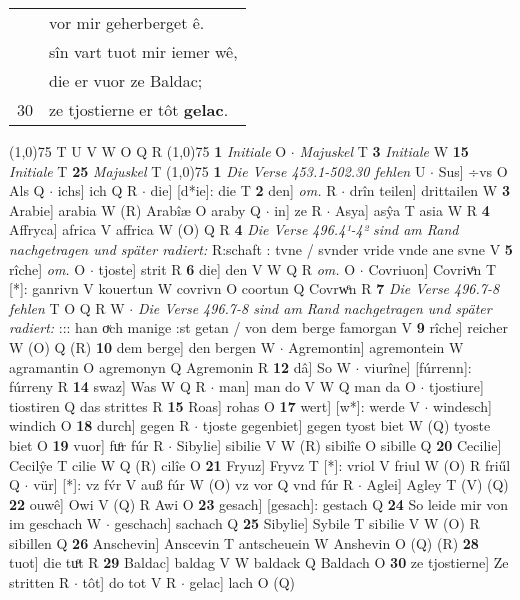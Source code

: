 \documentclass[8pt,a4paper,notitlepage]{article}
\begin{document}
\begin{table}[ht]
\begin{minipage}[t]{0.5\linewidth}
\begin{tabular}{rl}
 & vor mir geherberget ê.\\ 
 & sîn vart tuot mir iemer wê,\\ 
 & die er vuor ze Baldac;\\ 
30 & ze tjostierne er tôt \textbf{gelac}.\\ 
\end{tabular}
\scriptsize
\line(1,0){75} \newline
T U V W O Q R \newline
\line(1,0){75} \newline
\textbf{1} \textit{Initiale} O   $\cdot$ \textit{Majuskel} T  \textbf{3} \textit{Initiale} W  \textbf{15} \textit{Initiale} T  \textbf{25} \textit{Majuskel} T  \newline
\line(1,0){75} \newline
\textbf{1} \textit{Die Verse 453.1-502.30 fehlen} U   $\cdot$ Sus] ÷vs O Als Q  $\cdot$ ichs] ich Q R  $\cdot$ die] [d*ie]: die T \textbf{2} den] \textit{om.} R  $\cdot$ drîn teilen] drittailen W \textbf{3} Arabie] arabia W (R) Arabîæ O araby Q  $\cdot$ in] ze R  $\cdot$ Asya] asŷa T asia W R \textbf{4} Affryca] africa V affrica W (O) Q R \textbf{4} \textit{Die Verse 496.4¹-4² sind am Rand nachgetragen und später radiert:} R:schaft : tvne / svnder vride vnde ane svne V  \textbf{5} rîche] \textit{om.} O  $\cdot$ tjoste] strit R \textbf{6} die] den V W Q R \textit{om.} O  $\cdot$ Covriuon] Covrivͦn T [*]: ganrivn V kouertun W covrivn O coortun Q Covrwͦn R \textbf{7} \textit{Die Verse 496.7-8 fehlen} T O Q R W   $\cdot$ \textit{Die Verse 496.7-8 sind am Rand nachgetragen und später radiert:} ::: han oͮch manige :st getan / von dem berge famorgan V  \textbf{9} rîche] reicher W (O) Q (R) \textbf{10} dem berge] den bergen W  $\cdot$ Agremontin] agremontein W agramantin O agremonyn Q Agremonin R \textbf{12} dâ] So W  $\cdot$ viurîne] [fúrrenn]: fúrreny R \textbf{14} swaz] Was W Q R  $\cdot$ man] man do V W Q man da O  $\cdot$ tjostiure] tiostiren Q das strittes R \textbf{15} Roas] rohas O \textbf{17} wert] [w*]: werde V  $\cdot$ windesch] windich O \textbf{18} durch] gegen R  $\cdot$ tjoste gegenbiet] gegen tyost biet W (Q) tyoste biet O \textbf{19} vuor] fuͦr fúr R  $\cdot$ Sibylie] sibilie V W (R) sibilîe O sibille Q \textbf{20} Cecilie] Cecilŷe T cilie W Q (R) cilîe O \textbf{21} Fryuz] Fryvz T [*]: vriol V friul W (O) R friűl Q  $\cdot$ vür] [*]: vz fv́r V auß fúr W (O) vz vor Q vnd fúr R  $\cdot$ Aglei] Agley T (V) (Q) \textbf{22} ouwê] Owi V (Q) R Awi O \textbf{23} gesach] [gesach]: gestach Q \textbf{24} So leide mir von im geschach W  $\cdot$ geschach] sachach Q \textbf{25} Sibylie] Sybile T sibilie V W (O) R sibillen Q \textbf{26} Anschevin] Anscevin T antscheuein W Anshevin O (Q) (R) \textbf{28} tuot] die tuͦt R \textbf{29} Baldac] baldag V W baldack Q Baldach O \textbf{30} ze tjostierne] Ze stritten R  $\cdot$ tôt] do tot V R  $\cdot$ gelac] lach O (Q) \newline
\end{minipage}
\end{table}
\end{document}
